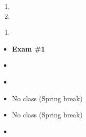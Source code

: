 \documentclass{article}
\begin{document}
%

\dia{}
\begin{enumerate}
\item {}
\item {}
\end{enumerate}

\dia{}
\begin{enumerate}
\item {}
\end{enumerate}

\week{}
\dia{}
\Review{}
\dia{}
\begin{itemize}
\item[ ] \textbf{Exam \#1}
\end{itemize}



\week{}
\dia{}
\begin{itemize}
\item {}
\end{itemize}

\dia{}
\begin{itemize}
\item {}
\end{itemize}

\week{}
\dia{}
\begin{itemize}
\item[ ] No class (Spring break)
\end{itemize}
\dia{}
\begin{itemize}
\item[ ] No class (Spring break)
\end{itemize}

\dia{}
\begin{itemize}
\item {}
\end{itemize}
\end{document}

